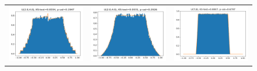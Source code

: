 \begin{figure}[tb]
\centering
\begin{tabular}{l l l}
\includegraphics[scale=0.25]{pics/Error_U_2_4_4_3.png}
&
\includegraphics[scale=0.25]{pics/Error_U_2_4_11_5.png}
&
\includegraphics[scale=0.25]{pics/Error_U_7_8.png}

\end{tabular}
\end{figure}
